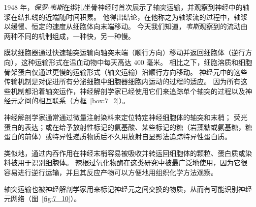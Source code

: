 1948 年，\textit{保罗$\cdot$韦斯}在绑扎坐骨神经时首次展示了轴突运输，并观察到神经中的轴浆在结扎线的近端随时间积累。
他得出结论，在他称之为轴浆流的过程中，轴浆以缓慢、恒定的速度从细胞体向末端移动。
今天我们知道，\textit{韦斯}观察到的流动由两种不同的机制组成，一种快，另一种慢。


膜状细胞器通过快速轴突运输向轴突末端（顺行方向）移动并返回细胞体（逆行方向），这种运输形式在温血动物中每天高达 400 毫米。
相比之下，细胞溶质和细胞骨架蛋白仅通过更慢的运输形式（轴突运输）沿顺行方向移动。
神经元中的这些传输机制是对促进所有分泌细胞中细胞器细胞内运动的过程的适应。
因为所有这些机制都沿着轴突运作，神经解剖学家已经使用它们来追踪单个轴突的过程以及神经元之间的相互联系（方框~\ref{box:7_2}）。

\begin{proposition}[神经解剖学追踪利用轴突运输] \label{box:7_2}
	
	\quad \quad 神经解剖学家通常通过微量注射染料来定位特定神经细胞体的轴突和末梢；
	荧光蛋白的表达；或在给予放射性标记的氨基酸、某些标记的糖（岩藻糖或氨基糖，糖蛋白的前体）或特异性递质物质后不久用放射自显影法追踪特异性蛋白质。
	
	\quad \quad 类似地，通过内吞作用在神经末梢容易被吸收并转运回细胞体的颗粒、蛋白质或染料被用于识别细胞体。
	辣根过氧化物酶在这类研究中被最广泛地使用，因为它很容易进行逆行运输，并且其反应产物可以方便地用组织化学方法观察。
	
	\quad \quad 轴突运输也被神经解剖学家用来标记神经元之间交换的物质，从而有可能识别神经元网络（图~\ref{fig:7_10}）。
	
\end{proposition}


